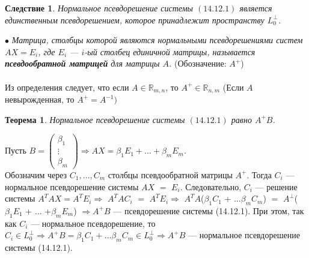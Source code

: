 \newtheorem*{cor3_12_1}{Следствие}\begin{cor3_12_1}Нормальное псевдорешение системы $(14.12.1)$ является единственным псевдорешением, которое принадлежит пространству $L_0^{\perp}$.\end{cor3_12_1}
$\bullet$\textit{ Матрица, столбцы которой являются нормальными псевдорешениями систем $AX = E_i$, где $E_i$ --- $i$-ый столбец единичной матрицы, называется \textbf{псевдообратной матрицей} для матрицы $A$.}  (Обозначение: $A^+$)\\\\
Из определения следует, что если $A\in \mathbb{R}_{m,n}$, то $A^+\in \mathbb{R}_{n,m}$ (Если $A$ невырожденная, то $A^+ = A^{-1})$
\newtheorem*{th12_2}{Теорема}\begin{th12_2} Нормальное псевдорешение системы $(14.12.1)$ равно $A^+B$. \end{th12_2}\begin{Proof}
	Пусть $B= \begin{pmatrix}
		\beta_1\\\vdots\\\beta_m
	\end{pmatrix} \Rightarrow AX = \beta_1E_1 + \ldots + \beta_mE_m$.\\ Обозначим через $C_1,\dots, C_m$ столбцы псевдообратной матрицы $A^+$. Тогда $C_i$ --- нормальное псевдорешение системы $AX$ $=$ $E_i$. Следовательно, $C_i$ --- решение системы $A^TAX  =  A^TE_i \Rightarrow$ $A^TAC_i$ $ = $ $A^TE_i \Rightarrow$ $A^TA$($\beta_1C_1$ + $\dots \beta_mC_m$) $ = $ $A^\perp$($\beta_1E_1$ + $\dots$ +$\beta_mE_m$) $\Rightarrow A^+B$ --- псевдорешение системы (14.12.1). При этом, так как $C_i$ --- нормальное псевдорешение, то $C_i\in L_0^\perp\Rightarrow A^+B = \beta_1C_1 + \dots \beta_mC_m \in L^\perp_0 \Rightarrow A^+B$ --- нормальное псевдорешение системы (14.12.1).
\end{Proof}